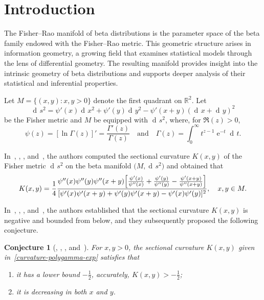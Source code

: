 \documentclass[reqno]{amsart}%
\theoremstyle{plain}
\newtheorem{conj}{Conjecture}
\theoremstyle{remark}
\DeclareMathOperator{\td}{d\!}
\DeclareMathOperator{\te}{e}
\begin{document}
\section{Introduction}
The Fisher--Rao manifold of beta distributions is the parameter space of the beta family endowed with the Fisher--Rao metric. This geometric structure arises in information geometry, a growing field that examines statistical models through the lens of differential geometry. The resulting manifold provides insight into the intrinsic geometry of beta distributions and supports deeper analysis of their statistical and inferential properties.
\par
Let $M=\{(x,y): x,y>0\}$ denote the first quadrant on $\mathbb{R}^2$. Let
\begin{equation*}
\td s^2=\psi'(x)\td x^2+\psi'(y)\td y^2-\psi'(x+y)(\td x+\td y)^2
\end{equation*}
be the Fisher metric and $M$ be equipped with $\td s^2$, where, for $\Re(z)>0$,
\begin{equation*}
\psi(z)=[\ln\Gamma(z)]'=\frac{\Gamma'(z)}{\Gamma(z)}\quad\text{and}\quad
\Gamma(z)=\int_0^{\infty}t^{z-1}\te^{-t}\td t.
\end{equation*}
\par
In~\cite[Proposition~3]{brigant2019fisherrao}, \cite[Proposition~14]{brigant2020fisherraoV1}, \cite[Proposition~15]{brigant2020fisherrao}, and~\cite[Proposition~15]{brigant2021fisherrao}, the authors computed the sectional curvature $K(x,y)$ of the Fisher metric $\td s^2$ on the beta manifold $\bigl(M,\td s^2\bigr)$ and obtained that
\begin{equation}\label{curvature-polygamma-exp}
K(x,y)=\frac{1}{4}\frac{\psi''(x)\psi''(y)\psi''(x+y) \Bigl[\frac{\psi'(x)}{\psi''(x)}+\frac{\psi'(y)}{\psi''(y)}-\frac{\psi'(x+y)}{\psi''(x+y)}\Bigr]}
{[\psi'(x)\psi'(x+y)+\psi'(y)\psi'(x+y)-\psi'(x)\psi'(y)]^2}, \quad x,y\in M.
\end{equation}
\par
In~\cite[Proposition~5]{brigant2019fisherrao}, \cite[Theorem~6]{brigant2020fisherraoV1}, \cite[Theorem~6]{brigant2020fisherrao}, and~\cite[Theorem~6]{brigant2021fisherrao}, the authors established that the sectional curvature $K(x,y)$ is negative and bounded from below, and they subsequently proposed the following conjecture.

\begin{conj}[{\cite[Proposition~5]{brigant2019fisherrao}, \cite[pp.~12--13]{brigant2020fisherraoV1}, \cite[p.~13--14]{brigant2020fisherrao}, and~\cite[p.~14]{brigant2021fisherrao}}]\label{Alice-lower-bound-conj}
For $x,y>0$, the sectional curvature $K(x,y)$ given in~\eqref{curvature-polygamma-exp} satisfies that
\begin{enumerate}
\item
it has a lower bound $-\frac{1}{2}$, accurately, $K(x,y)>-\frac{1}{2}$;
\item
it is decreasing in both $x$ and $y$.
\end{enumerate}
\end{conj}
\end{document}

